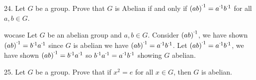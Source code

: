 \begin{mdframed}[style=darkAnswer,frametitle={Joe Starr}]
\end{mdframed}
\newpage
\begin{mdframed}[style=darkQuesion]
  24. Let $G$ be a group. Prove that $G$ is Abelian if and only if 
  $\inv{\lrp{ab}}=\inv{a}\inv{b}$ for all $a,b\in G$. 
\end{mdframed}

\begin{mdframed}[style=darkAnswer,frametitle={Joe Starr}]
    wocase{
    Let $G$ be an abelian group and $a,b\in G$. Consider $\inv{\lrp{ab}}$, we have
    shown $\inv{\lrp{ab}}=\inv{b}\inv{a}$ since $G$ is abelian we have 
    $\inv{\lrp{ab}}=\inv{a}\inv{b}$.
    }{
    Let $\inv{\lrp{ab}}=\inv{a}\inv{b}$, we have shown 
    $\inv{\lrp{ab}}=\inv{b}\inv{a}$ so $\inv{b}\inv{a}=\inv{a}\inv{b}$ showing $G$
    abelian.
  }
\end{mdframed}
\newpage
\begin{mdframed}[style=darkQuesion]
  25. Let $G$ be a group. Prove that if $x^2=e$ for all $x\in G$, then $G$ is 
  abelian. 
\end{mdframed}

